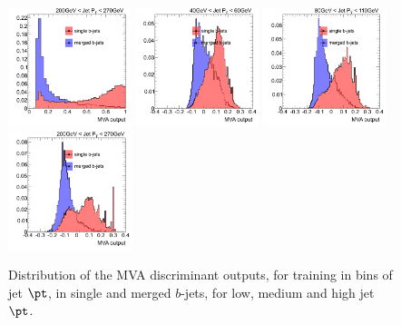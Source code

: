 \begin{figure}[tp]
\includegraphics[width=0.32\textwidth]{FIGS/TEMPFigs/MVA_differentMethods/bins/NNoutput200_MLP.pdf}
\includegraphics[width=0.32\textwidth]{FIGS/TEMPFigs/MVA_differentMethods/bins/NNoutput040_BDT.pdf}
\includegraphics[width=0.32\textwidth]{FIGS/TEMPFigs/MVA_differentMethods/bins/NNoutput080_BDT.pdf}
\includegraphics[width=0.32\textwidth]{FIGS/TEMPFigs/MVA_differentMethods/bins/NNoutput200_BDT.pdf}
\caption{Distribution of the MVA discriminant outputs, for training in bins of jet $\pt$, in single and merged $b$-jets, for low, medium and high jet $\pt$.}
\label{fig:diffmethodsBins}
\end{figure}

